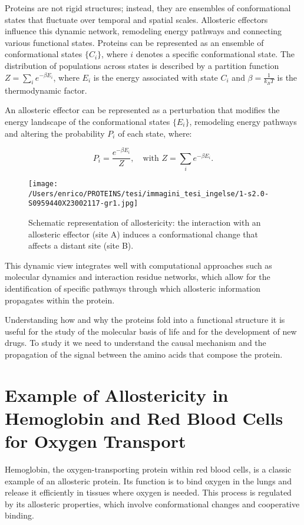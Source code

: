 \documentclass[English, Lau, oneside]{sapthesis}
\begin{document}
Proteins are not rigid structures; instead, they are ensembles of conformational states that fluctuate over temporal and spatial scales. Allosteric effectors influence this dynamic network, remodeling energy pathways and connecting various functional states. Proteins can be represented as an ensemble of conformational states \(\{C_i\}\), where \(i\) denotes a specific conformational state. The distribution of populations across states is described by a partition function \(Z = \sum_i e^{-\beta E_i}\), where \(E_i\) is the energy associated with state \(C_i\) and \(\beta = \frac{1}{k_B T}\) is the thermodynamic factor.

An allosteric effector can be represented as a perturbation that modifies the energy landscape of the conformational states \(\{E_i\}\), remodeling energy pathways and altering the probability \(P_i\) of each state, where:

\[
P_i = \frac{e^{-\beta E_i}}{Z}, \quad \text{with } Z = \sum_i e^{-\beta E_i}.
\]

\begin{figure}[h]
    \centering
    \texttt{[image: /Users/enrico/PROTEINS/tesi/immagini\_tesi\_ingelse/1-s2.0-S0959440X23002117-gr1.jpg]}
    \caption{Schematic representation of allostericity: the interaction with an allosteric effector (site A) induces a conformational change that affects a distant site (site B).}
    \label{fig:allostericity_dynamics}
\end{figure}

This dynamic view integrates well with computational approaches such as molecular dynamics and interaction residue networks, which allow for the identification of specific pathways through which allosteric information propagates within the protein.

Understanding how and why the proteins fold into a functional structure it is useful for the study of the molecular basis of life and for the development of new drugs.
To study it we need to understand the causal mechanism and the propagation of the signal between the amino acids that compose the protein.
\section{Example of Allostericity in Hemoglobin and Red Blood Cells for Oxygen Transport}

Hemoglobin, the oxygen-transporting protein within red blood cells, is a classic example of an allosteric protein. Its function is to bind oxygen in the lungs and release it efficiently in tissues where oxygen is needed. This process is regulated by its allosteric properties, which involve conformational changes and cooperative binding.
\end{document}

